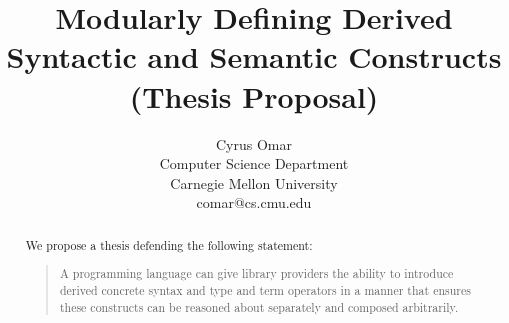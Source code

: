 \documentclass[10pt]{article}
\title{Modularly Defining Derived Syntactic and Semantic Constructs\\(Thesis Proposal)}
\author{Cyrus Omar\\
 Computer Science Department\\
 Carnegie Mellon University\\
 comar@cs.cmu.edu}
\date{}                                           %
\theoremstyle{definition}
\begin{document}
\maketitle

\begin{abstract}
\noindent


We propose a thesis defending the following statement:
\begin{quote}
A programming language can give library providers the ability to introduce derived concrete syntax and type and term operators in a manner that ensures these constructs can be reasoned about separately and composed arbitrarily.
\end{quote}
\end{abstract}\vspace{-5px}

\sloppy

\begin{center}



\normalsize
\end{center}
\end{document}
